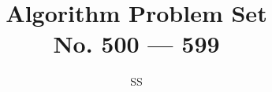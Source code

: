 \documentclass[a4paper,12pt]{article}
\title{Algorithm Problem Set \\ \large No. 500 --- 599}
\author{SS}
\begin{document}
\def\bottom#1#2{\hbox{\vbox to #1{\vfill\hbox{#2}}}}
\renewcommand{\thelstlisting}{\thesection.\arabic{lstlisting}}
\newcommand{\fcc}[1]{\lstinline[language=C++, basicstyle=\small\ttfamily, keywordstyle=\bfseries\color{green!40!black}]|#1|}
\newcommand{\fcj}[1]{\lstinline[language=Java, basicstyle=\small\ttfamily, keywordstyle=\bfseries\color{green!40!black}]|#1|}
\sloppy
\maketitle
%
%
%
%
%
%
%
%
%
%

%
%
%
%
%
%
%
%
%
%
%
%
%
%
%
%
%
%
%
%
%
%
%
%
%
%
%
%
%
%
%
%
%
%
%
%
%
%

%
%
%
%
%
%
%
%
%
%
%
%
%
%
%

%
%
%
%
%
%
%
%
%
%
%
%
%
%
%
%
%
%
%
%
%








%
%
%


\end{document}
